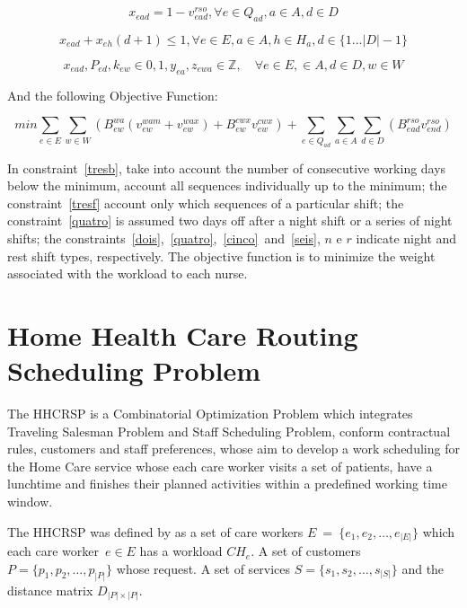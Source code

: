 \begin{equation}\label{oito}
x_{ead} = 1 - v_{ead}^{rso}, \forall e \in Q_{ad}, a \in A, d \in D
\end{equation}

\begin{equation}\label{nove}
x_{ead} + x_{eh}(d+1) \leq 1, \forall e \in E, a \in A, h \in H_a, d \in \{1...|D|-1\}
\end{equation}

$$x_{ead}, P_{ed}, k_{ew} \in {0,1}, y_{ea}, z_{ewa} \in \mathds{Z}, \quad \forall e \in E, \in A, d \in D, w \in W $$

And the following Objective Function:

$$ min \sum_{e \in E} \sum_{w \in W} (B_{ew}^{wa}(v_{ew}^{wam}+ v_{ew}^{wax})+B_{ew}^{cwx}v_{ew}^{cwx}) + \sum_{e \in Q_{ad}} \sum_{a \in A} \sum_{d \in D}(B_{ead}^{rso}v_{end}^{rso}) $$


In constraint~\ref{tresb}, take into account the number of consecutive working days below the minimum, account all sequences individually up to the minimum; the constraint~\ref{tresf} account only which sequences of a particular shift; the constraint~\ref{quatro} is assumed two days off after a night shift or a series of night shifts; the constraints~\ref{dois},~\ref{quatro},~\ref{cinco}~and~\ref{seis}, $n$ e $r$ indicate night and rest shift types, respectively. The objective function is to minimize the weight associated with the workload to each nurse.

\section{Home Health Care Routing Scheduling Problem}

The \ac{HHCRSP} is a Combinatorial Optimization Problem which integrates Traveling Salesman Problem and Staff Scheduling Problem, conform contractual rules, customers and staff preferences, 
whose aim to develop a work scheduling for the Home Care service whose each care worker visits a set of patients, have a lunchtime and finishes their planned activities within a predefined working time window. 

The \ac{HHCRSP} was defined by  as a set of care workers $E~=~\{ e_1, e_2, \ldots, e_{|E|} \}$ which each care worker~$e\in E$ has a workload $CH_e$. A set of customers $P = \{p_1, p_2, \ldots, p_{|P|} \}$ whose request. A set of  services $S = \{ s_1, s_2, \ldots, s_{|S|} \}$ and the distance matrix $D_{|P|\times |P|}$.


